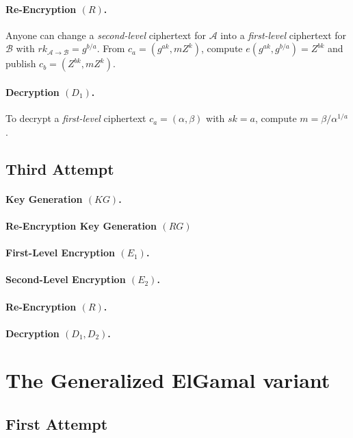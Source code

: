 \documentclass[a4paper,11pt]{article}
\begin{document}
\paragraph{Re-Encryption $(R)$.} Anyone can change a \emph{second-level} ciphertext for $\mathcal{A}$ into a \emph{first-level} ciphertext for $\mathcal{B}$ with $rk_{\mathcal{A}\rightarrow \mathcal{B}} = g^{b/a}$.
From $c_{a} = (g^{ak},mZ^{k})$, compute $e(g^{ak},g^{b/a}) = Z^{bk}$ and publish $c_{b} = (Z^{bk},mZ^{k})$.
\paragraph{Decryption $(D_{1})$.} To decrypt a \emph{first-level} ciphertext $c_{a} = (\alpha, \beta)$ with $sk = a$, compute $m = \beta/\alpha^{1/a}$.

\subsection{Third Attempt}\label{sec:three:3}

\paragraph{Key Generation $(KG)$.}
\paragraph{Re-Encryption Key Generation $(RG)$}
\paragraph{First-Level Encryption $(E_{1})$.}
\paragraph{Second-Level Encryption $(E_{2})$.}
\paragraph{Re-Encryption $(R)$.}
\paragraph{Decryption $(D_{1}, D_{2})$.}


\section{The Generalized ElGamal variant}\label{sec:four}

\subsection{First Attempt}\label{sec:four:1}
\end{document}
